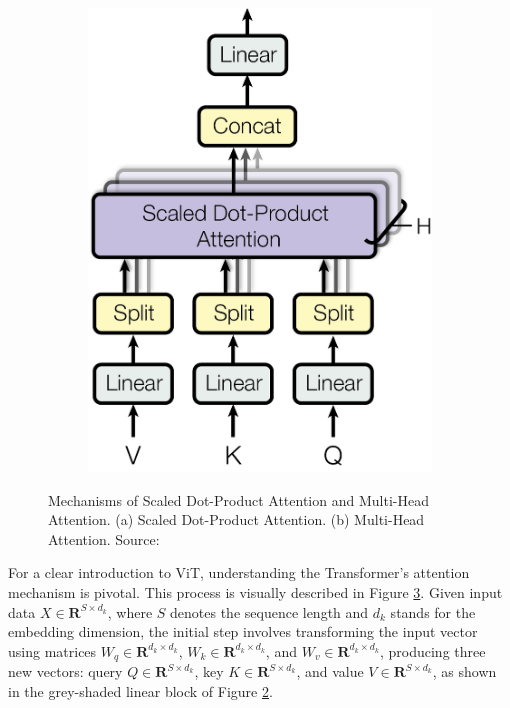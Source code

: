 \begin{figure}
\begin{subfigure}[b]{0.2\textwidth}
        \caption{}
        \label{fig:dotproductattention}
    \end{subfigure}
    \hfill
    \begin{subfigure}[b]{0.3\textwidth}
        \centering
        \includegraphics[width=\textwidth]{assets/charts_rw/Transformer_MultiHeadAttention.png}
        \caption{}
        \label{fig:multiheadattention}
    \end{subfigure}
    \caption{Mechanisms of Scaled Dot-Product Attention and Multi-Head Attention. (a) Scaled Dot-Product Attention. (b) Multi-Head Attention. Source: \parencite{vaswani2017attention}}
    \label{fig:attentionmechanism}
\end{figure}

For a clear introduction to ViT, understanding the Transformer's attention mechanism is pivotal. This process is visually described in Figure \ref{fig:attentionmechanism}. Given input data $X \in \mathbf{R}^{S \times d_k}$, where $S$ denotes the sequence length and $d_k$ stands for the embedding dimension, the initial step involves transforming the input vector using matrices $W_q \in \mathbf{R}^{d_k \times d_k}$, $W_k \in \mathbf{R}^{d_k \times d_k}$, and $W_v \in \mathbf{R}^{d_k \times d_k}$, producing three new vectors: query $Q \in \mathbf{R}^{S \times d_k}$, key $K \in \mathbf{R}^{S \times d_k}$, and value $V \in \mathbf{R}^{S \times d_k}$, as shown in the grey-shaded linear block of Figure \ref{fig:multiheadattention}.

